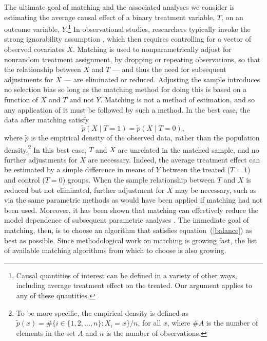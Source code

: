 \documentclass[11pt,titlepage]{article}
\begin{document}
The ultimate goal of matching and the associated analyses we consider
is estimating the average causal effect of a binary treatment
variable, $T$, on an outcome variable, $Y$.\footnote{Causal quantities
  of interest can be defined in a variety of other ways, including
  average treatment effect on the treated.  Our argument applies to
  any of these quantities.}  In observational studies, researchers
typically invoke the strong ignorability assumption \citep{RosRub83},
which then requires controlling for a vector of observed covariates
$X$.  Matching is used to nonparametrically adjust for nonrandom
treatment assignment, by dropping or repeating observations, so that
the relationship between $X$ and $T$ --- and thus the need for
subsequent adjustments for $X$ --- are eliminated or reduced.
Adjusting the sample introduces no selection bias so long as the
matching method for doing this is based on a function of $X$ and $T$
and not $Y$.  Matching is not a method of estimation, and so any
application of it must be followed by such a method.  In the best
case, the data after matching satisfy
\begin{equation}
  \label{balance}
  \tilde p(X\mid T=1) = \tilde p(X\mid T=0),
\end{equation}
where $\tilde p$ is the empirical density of the observed data, rather
than the population density.\footnote{To be more specific, the
  empirical density is defined as $\tilde p(x) = \# \{ i\in \{1, 2,
  \dots, n \}: X_i = x \} / n$, for all $x$, where $\#A$ is the number
  of elements in the set $A$ and $n$ is the number of observations. }
In this best case, $T$ and $X$ are unrelated in the matched sample,
and no further adjustments for $X$ are necessary. Indeed, the average
treatment effect can be estimated by a simple difference in means of
$Y$ between the treated ($T=1$) and control ($T=0$) groups.  When the
sample relationship between $T$ and $X$ is reduced but not eliminated,
further adjustment for $X$ may be necessary, such as via the same
parametric methods as would have been applied if matching had not been
used. Moreover, it has been shown that matching can effectively reduce
the model dependence of subsequent parametric analyses
\citep{HoImaKin06}.  The immediate goal of matching, then, is to
choose an algorithm that satisfies equation~(\ref{balance}) as best as
possible.  Since methodological work on matching is growing fast, the
list of available matching algorithms from which to choose is also
growing.
\end{document}
